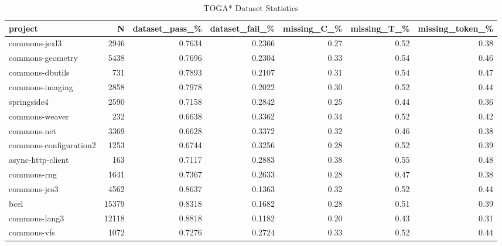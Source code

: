 \begin{table*}
\centering
\caption{TOGA* Dataset Statistics}
\label{tab:toga_stats_all}
\begin{tabular}{lrrrrrr}
\toprule
                project &       N &  dataset\_pass\_\% &  dataset\_fail\_\% &  missing\_C\_\% &  missing\_T\_\% &  missing\_token\_\% \\
\midrule
          commons-jexl3 &    2946 &          0.7634 &          0.2366 &         0.27 &         0.52 &             0.38 \\
       commons-geometry &    5438 &          0.7696 &          0.2304 &         0.33 &         0.54 &             0.46 \\
        commons-dbutils &     731 &          0.7893 &          0.2107 &         0.31 &         0.54 &             0.47 \\
        commons-imaging &    2858 &          0.7978 &          0.2022 &         0.30 &         0.52 &             0.44 \\
            springside4 &    2590 &          0.7158 &          0.2842 &         0.25 &         0.44 &             0.36 \\
         commons-weaver &     232 &          0.6638 &          0.3362 &         0.34 &         0.52 &             0.42 \\
            commons-net &    3369 &          0.6628 &          0.3372 &         0.32 &         0.46 &             0.38 \\
 commons-configuration2 &    1253 &          0.6744 &          0.3256 &         0.28 &         0.52 &             0.39 \\
      async-http-client &     163 &          0.7117 &          0.2883 &         0.38 &         0.55 &             0.48 \\
            commons-rng &    1641 &          0.7367 &          0.2633 &         0.28 &         0.47 &             0.38 \\
           commons-jcs3 &    4562 &          0.8637 &          0.1363 &         0.32 &         0.52 &             0.44 \\
                   bcel &   15379 &          0.8318 &          0.1682 &         0.28 &         0.51 &             0.39 \\
          commons-lang3 &   12118 &          0.8818 &          0.1182 &         0.20 &         0.43 &             0.31 \\
            commons-vfs &    1072 &          0.7276 &          0.2724 &         0.33 &         0.52 &             0.44 \\

\end{tabular}
\end{table*}
